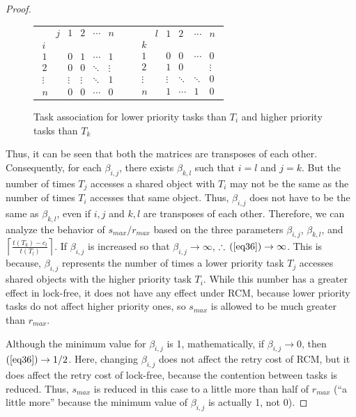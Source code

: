 \documentclass[a4paper,english]{article}
\providecommand{\tabularnewline}{\\}
\newtheorem{proof}{Proof}
\begin{document}
\begin{proof}
\begin{figure}[htbp]
\begin{tabular}{ccc}
$\begin{array}{cccccc}
 & j & 1 & 2 & \cdots & n\\
i\\
1 &  & 0 & 1 & \cdots & 1\\
2 &  & 0 & 0 & \ddots & \vdots\\
\vdots &  & \vdots & \vdots & \ddots & 1\\
n &  & 0 & 0 & \cdots & 0\end{array}$ &  & $\begin{array}{cccccc}
 & l & 1 & 2 & \cdots & n\\
k\\
1 &  & 0 & 0 & \cdots & 0\\
2 &  & 1 & 0 &  & \vdots\\
\vdots &  & \vdots & \ddots & \ddots & 0\\
n &  & 1 & \cdots & 1 & 0\end{array}$\tabularnewline
\end{tabular}
\caption{\label{fig:matrix-example} Task association for lower priority tasks than $T_i$ and higher priority tasks than $T_k$}
\end{figure}

Thus, it can be seen that both the matrices are transposes of
each other. Consequently, for each $\beta_{i,j}$, there exists $\beta_{k,l}$
such that $i=l$ and $j=k$. But the number of times $T_{j}$ accesses
a shared object with $T_{i}$ may not be the same as the number of times
$T_{i}$ accesses that same object. Thus, $\beta_{i,j}$ does not have
to be the same as $\beta_{k,l}$, even if $i,j$ and $k,l$ are transposes 
of each other. Therefore, we can analyze the behavior of $s_{max}/r_{max}$ based on the three parameters $\beta_{i,j}$, $\beta_{k,l}$, and $\left\lceil\frac{t(T_{k})-c_{l}}{t(T_{l})}\right\rceil$.
If $\beta_{i,j}$ is increased so that $\beta_{i,j}\rightarrow\infty$,
$\therefore\,(\ref{eq36})\rightarrow\infty$.
This is because, $\beta_{i,j}$ represents the number of times a lower priority task $T_{j}$ accesses 
shared objects with the higher priority task $T_{i}$. 
While this number has a greater effect in lock-free, it does not have any effect under RCM, because lower priority tasks do not affect higher priority
ones, so $s_{max}$ is allowed to be much greater than $r_{max}$.

Although the minimum value for $\beta_{i,j}$ is 1, mathematically, if $\beta_{i,j}\rightarrow0$, then $(\ref{eq36})\rightarrow1/2$.
Here, changing $\beta_{i,j}$ does not affect the retry cost of RCM, but it does affect the retry cost of lock-free, because the contention between tasks is reduced. Thus, $s_{max}$ is reduced in this case to
a little more than half of $r_{max}$ (``a little more''
because the minimum value of $\beta_{i,j}$ is actually 1, not 0).



\end{proof}
\end{document}
